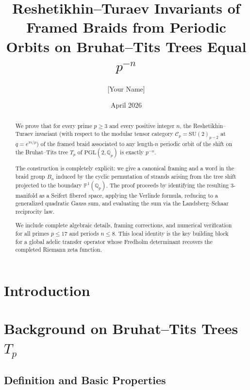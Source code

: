 \documentclass[11pt,a4paper]{amsart}
\title{Reshetikhin--Turaev Invariants of Framed Braids from Periodic Orbits on Bruhat--Tits Trees Equal \(p^{-n}\)}
\author{[Your Name]}
\date{April 2026}
\begin{document}
\maketitle

\begin{abstract}
We prove that for every prime \(p\geq 3\) and every positive integer \(n\), the Reshetikhin--Turaev invariant (with respect to the modular tensor category \(\mathcal{C}_p=\mathrm{SU}(2)_{p-2}\) at \(q=e^{\pi i/p}\)) of the framed braid associated to any length-\(n\) periodic orbit of the shift on the Bruhat--Tits tree \(T_p\) of \(\mathrm{PGL}(2,\mathbb{Q}_p)\) is exactly \(p^{-n}\).

The construction is completely explicit: we give a canonical framing and a word in the braid group \(B_n\) induced by the cyclic permutation of strands arising from the tree shift projected to the boundary \(\mathbb{P}^1(\mathbb{Q}_p)\). The proof proceeds by identifying the resulting 3-manifold as a Seifert fibered space, applying the Verlinde formula, reducing to a generalized quadratic Gauss sum, and evaluating the sum via the Landsberg--Schaar reciprocity law.

We include complete algebraic details, framing corrections, and numerical verification for all primes \(p\leq 17\) and periods \(n\leq 8\). This local identity is the key building block for a global adelic transfer operator whose Fredholm determinant recovers the completed Riemann zeta function.
\end{abstract}

\section{Introduction}
\label{sec:intro}


\section{Background on Bruhat--Tits Trees \(T_p\)}
\label{sec:trees}

\subsection{Definition and Basic Properties}

\end{document}
